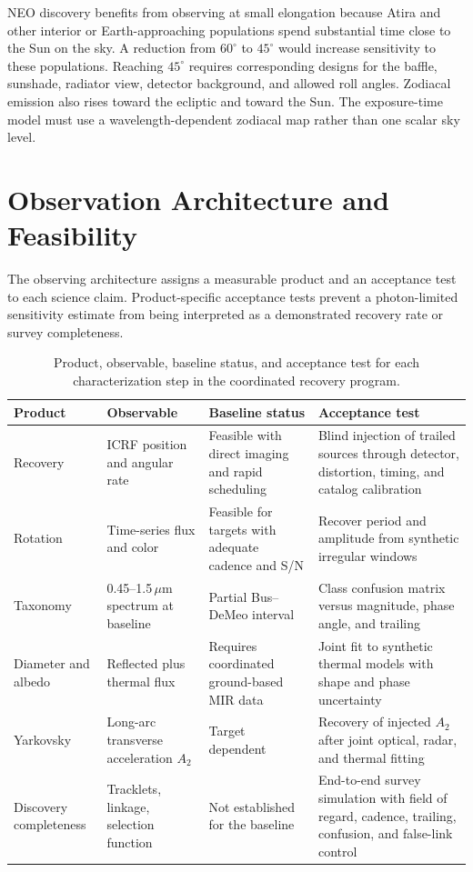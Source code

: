 NEO discovery benefits from observing at small elongation because Atira and
other interior or Earth-approaching populations spend substantial time close
to the Sun on the sky. A reduction from $60^\circ$ to $45^\circ$ would increase
sensitivity to these populations. Reaching $45^\circ$ requires corresponding
designs for the baffle, sunshade, radiator view, detector background, and
allowed roll angles. Zodiacal emission also rises toward the ecliptic and
toward the Sun.
The exposure-time model must use a wavelength-dependent zodiacal map rather
than one scalar sky level.

\section{Observation Architecture and Feasibility}

The observing architecture assigns a measurable product and an acceptance
test to each science claim. Product-specific acceptance tests prevent a
photon-limited sensitivity estimate from being interpreted as a demonstrated
recovery rate or survey completeness.

\begin{longtable}{@{}P{30mm}P{36mm}P{46mm}P{46mm}@{}}
\caption{Product, observable, baseline status, and acceptance test for
each characterization step in the coordinated recovery program.}
\label{tab:c3-acceptance-tests}\\
\toprule
\color{cGold}\textbf{Product} &
\color{cGold}\textbf{Observable} &
\color{cGold}\textbf{Baseline status} &
\color{cGold}\textbf{Acceptance test}\\
\midrule
\endhead
Recovery &
ICRF position and angular rate &
Feasible with direct imaging and rapid scheduling &
Blind injection of trailed sources through detector, distortion, timing,
and catalog calibration\\
Rotation &
Time-series flux and color &
Feasible for targets with adequate cadence and S/N &
Recover period and amplitude from synthetic irregular windows\\
Taxonomy &
0.45--1.5\,$\mu$m spectrum at baseline &
Partial Bus--DeMeo interval &
Class confusion matrix versus magnitude, phase angle, and trailing\\
Diameter and albedo &
Reflected plus thermal flux &
Requires coordinated ground-based MIR data &
Joint fit to synthetic thermal models with shape and phase uncertainty\\
Yarkovsky &
Long-arc transverse acceleration $A_2$ &
Target dependent &
Recovery of injected $A_2$ after joint optical, radar, and thermal fitting\\
Discovery completeness &
Tracklets, linkage, selection function &
Not established for the baseline &
End-to-end survey simulation with field of regard, cadence, trailing,
confusion, and false-link control\\
\bottomrule
\end{longtable}

